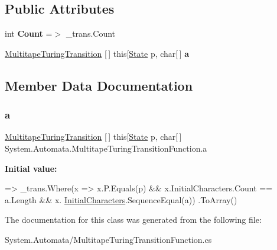 \subsection*{Public Attributes}
\begin{DoxyCompactItemize}
\item 
\mbox{\label{class_system_1_1_automata_1_1_multitape_turing_transition_function_a19f2ec1f5277d8f90e9bf762d1acdc30}} 
int {\bfseries Count} =$>$ \+\_\+trans.\+Count
\item 
\mbox{\hyperlink{class_system_1_1_automata_1_1_multitape_turing_transition}{Multitape\+Turing\+Transition}} \mbox{[}$\,$\mbox{]} this\mbox{[}\mbox{\hyperlink{class_system_1_1_automata_1_1_state}{State}} p, char\mbox{[}$\,$\mbox{]} {\bfseries a}
\end{DoxyCompactItemize}


\subsection{Member Data Documentation}
\mbox{\label{class_system_1_1_automata_1_1_multitape_turing_transition_function_a9cfbfb52eb78895705fa0b46908e55c6}} 
\subsubsection{\texorpdfstring{a}{a}}
{\footnotesize\ttfamily \mbox{\hyperlink{class_system_1_1_automata_1_1_multitape_turing_transition}{Multitape\+Turing\+Transition}} \mbox{[}$\,$\mbox{]} this\mbox{[}\mbox{\hyperlink{class_system_1_1_automata_1_1_state}{State}} p, char\mbox{[}$\,$\mbox{]} System.\+Automata.\+Multitape\+Turing\+Transition\+Function.\+a}

{\bfseries Initial value\+:}
\begin{DoxyCode}
=>
            \_trans.Where(x => x.P.Equals(p) && x.InitialCharacters.Count == a.Length && x.
      \mbox{\hyperlink{class_system_1_1_automata_1_1_multitape_turing_transition_ac75736919c5dd909eda605dbb2e1a963}{InitialCharacters}}.SequenceEqual(a))
                .ToArray()
\end{DoxyCode}


The documentation for this class was generated from the following file\+:\begin{DoxyCompactItemize}
\item 
System.\+Automata/Multitape\+Turing\+Transition\+Function.\+cs\end{DoxyCompactItemize}
